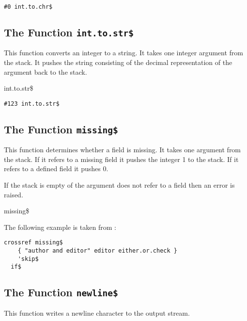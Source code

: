 \begin{lstlisting}[language=bst]
  #0 int.to.chr$
\end{lstlisting}

\subsection{The Function \texttt{int.to.str\$}}%

This function converts an integer to a string. It takes one integer
argument from the stack. It pushes the string consisting of the
decimal representation of the argument back to the stack.

\begin{BstFunction}{int.to.str\$}
\end{BstFunction}

\begin{lstlisting}[language=bst]
  #123 int.to.str$
\end{lstlisting}


\subsection{The Function \texttt{missing\$}}%

This function determines whether a field is missing. It takes one
argument from the stack. If it refers to a missing field it pushes the
integer 1 to the stack. If it refers to a defined field it pushes 0.

If the stack is empty of the argument does not refer to a field then
an error is raised.
 
\begin{BstFunction}{missing\$}
\end{BstFunction}

The following example is taken from :

\begin{lstlisting}[language=bst]
    crossref missing$
    { "author and editor" editor either.or.check }
    'skip$
  if$
\end{lstlisting}


\subsection{The Function \texttt{newline\$}}%

This function writes a newline character to the output stream.

